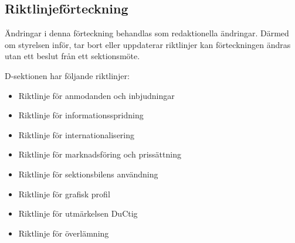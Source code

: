\documentclass[]{dsekprotokoll}
\begin{document}
\subsection{Riktlinjeförteckning}
Ändringar i denna förteckning behandlas som redaktionella ändringar. Därmed om styrelsen inför, tar bort eller uppdaterar riktlinjer kan förteckningen ändras utan ett beslut från ett sektionsmöte.

D-sektionen har följande riktlinjer:
\begin{itemize}
    \item Riktlinje för anmodanden och inbjudningar
    \item Riktlinje för informationsspridning
    \item Riktlinje för internationalisering
    \item Riktlinje för marknadsföring och prissättning
    \item Riktlinje för sektionsbilens användning
    \item Riktlinje för grafisk profil
    \item Riktlinje för utmärkelsen DuCtig
    \item Riktlinje för överlämning
\end{itemize}
\end{document}
